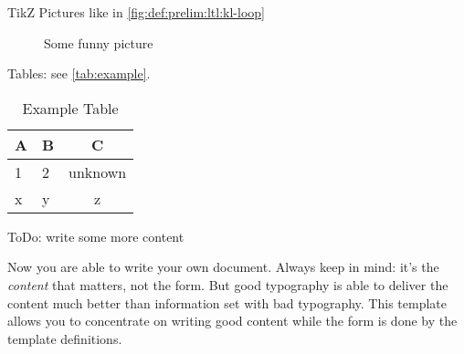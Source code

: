 TikZ Pictures like in \autoref{fig:def:prelim:ltl:kl-loop}
\begin{figure}
  \centering
  \caption{Some funny picture}
  \label{fig:def:prelim:ltl:kl-loop}
\end{figure}


Tables: see \autoref{tab:example}.

\begin{table}
	\centering
	\caption{Example Table}
	\label{tab:example}
	\begin{tabular}{llc}
	\toprule
	A & B & C\\
	\midrule
	1 & 2 & unknown\\
	x & y & z\\
	\bottomrule
	\end{tabular}
\end{table}

\begin{todobox}
ToDo: write some more content
\end{todobox}


Now you are able to write your own document. Always keep in mind: it's
the \emph{content} that matters, not the form. But good typography is
able to deliver the content much better than information set with bad
typography. This template allows you to concentrate on writing good
content while the form is done by the template definitions.